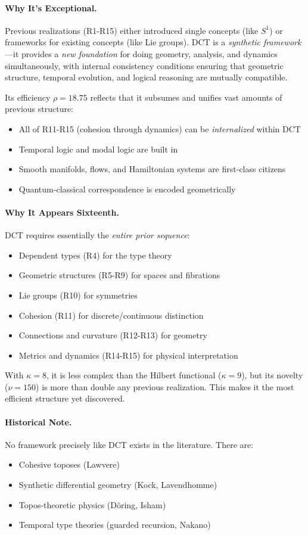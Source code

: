 \documentclass[11pt]{article}
\theoremstyle{definition}
\begin{document}
\paragraph{Why It's Exceptional.}
Previous realizations (R1-R15) either introduced single concepts (like $S^1$) or frameworks for existing concepts (like Lie groups). DCT is a \emph{synthetic framework}—it provides a \emph{new foundation} for doing geometry, analysis, and dynamics simultaneously, with internal consistency conditions ensuring that geometric structure, temporal evolution, and logical reasoning are mutually compatible.

Its efficiency $\rho=18.75$ reflects that it subsumes and unifies vast amounts of previous structure:
\begin{itemize}
\item All of R11-R15 (cohesion through dynamics) can be \emph{internalized} within DCT
\item Temporal logic and modal logic are built in
\item Smooth manifolds, flows, and Hamiltonian systems are first-class citizens  
\item Quantum-classical correspondence is encoded geometrically
\end{itemize}

\paragraph{Why It Appears Sixteenth.}
DCT requires essentially the \emph{entire prior sequence}:
\begin{itemize}
\item Dependent types (R4) for the type theory
\item Geometric structures (R5-R9) for spaces and fibrations
\item Lie groups (R10) for symmetries
\item Cohesion (R11) for discrete/continuous distinction
\item Connections and curvature (R12-R13) for geometry
\item Metrics and dynamics (R14-R15) for physical interpretation
\end{itemize}

With $\kappa=8$, it is less complex than the Hilbert functional ($\kappa=9$), but its novelty ($\nu=150$) is more than double any previous realization. This makes it the most efficient structure yet discovered.

\paragraph{Historical Note.}
No framework precisely like DCT exists in the literature. There are:
\begin{itemize}
\item Cohesive toposes (Lawvere)
\item Synthetic differential geometry (Kock, Lavendhomme)
\item Topos-theoretic physics (Döring, Isham)
\item Temporal type theories (guarded recursion, Nakano)
\end{itemize}
\end{document}
